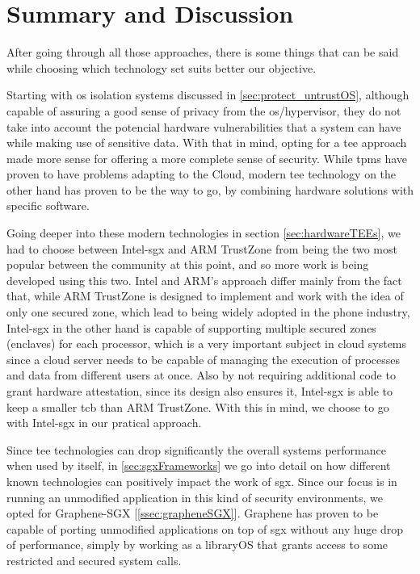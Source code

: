 \section{Summary and Discussion}
\label{sec:summary}


After going through all those approaches, there is some things that can be said while choosing which technology set suits better our objective. 

Starting with \gls{os} isolation systems discussed in \ref{sec:protect_untrustOS}, although capable of assuring a good sense of privacy from the \gls{os}/hypervisor, they do not take into account the potencial hardware vulnerabilities that a system can have while making use of sensitive data. 
With that in mind, opting for a \gls{tee} approach made more sense for offering a more complete sense of security.
While \gls{tpm}s have proven to have problems adapting to the Cloud, modern \gls{tee} technology on the other hand has proven to be the way to go, by combining hardware solutions with specific software.

Going deeper into these modern technologies in section \ref{sec:hardwareTEEs}, we had to choose between Intel-\gls{sgx} and ARM TrustZone from being the two most popular between the community at this point, and so more work is being developed using this two. Intel and ARM's approach differ mainly from the fact that, while ARM TrustZone is designed to implement and work with the idea of only one secured zone, which lead to being widely adopted in the phone industry, Intel-\gls{sgx} in the other hand is capable of supporting multiple secured zones (enclaves) for each processor, which is a very important subject in cloud systems since a cloud server needs to be capable of managing the execution of processes and data from different users at once. Also by not requiring additional code to grant hardware attestation, since its design also ensures it, Intel-\gls{sgx} is able to keep a smaller \gls{tcb} than ARM TrustZone. With this in mind, we choose to go with Intel-\gls{sgx} in our pratical approach.

Since \gls{tee} technologies can drop significantly the overall systems performance when used by itself, in \ref{sec:sgxFrameworks} we go into detail on how different known technologies can positively impact the work of \gls{sgx}. Since our focus is in running an unmodified application in this kind of security environments, we opted for Graphene-SGX [\ref{ssec:grapheneSGX}]. Graphene has proven to be capable of porting unmodified applications on top of \gls{sgx} without any huge drop of performance, simply by working as a libraryOS that grants access to some restricted and secured system calls.








